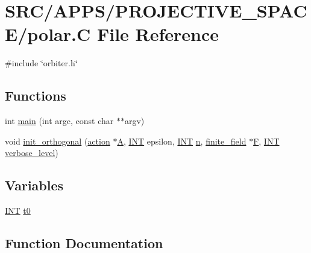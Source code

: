 \hypertarget{_a_p_p_s_2_p_r_o_j_e_c_t_i_v_e___s_p_a_c_e_2polar_8_c}{}\section{S\+R\+C/\+A\+P\+P\+S/\+P\+R\+O\+J\+E\+C\+T\+I\+V\+E\+\_\+\+S\+P\+A\+C\+E/polar.C File Reference}
\label{_a_p_p_s_2_p_r_o_j_e_c_t_i_v_e___s_p_a_c_e_2polar_8_c}
{\ttfamily \#include \char`\"{}orbiter.\+h\char`\"{}}\newline
\subsection*{Functions}
\begin{DoxyCompactItemize}
\item 
int \mbox{\hyperlink{_a_p_p_s_2_p_r_o_j_e_c_t_i_v_e___s_p_a_c_e_2polar_8_c_a217dbf8b442f20279ea00b898af96f52}{main}} (int argc, const char $\ast$$\ast$argv)
\item 
void \mbox{\hyperlink{_a_p_p_s_2_p_r_o_j_e_c_t_i_v_e___s_p_a_c_e_2polar_8_c_abf695eb9f6a0c10d5aa0c0ce4b60ad6d}{init\+\_\+orthogonal}} (\mbox{\hyperlink{classaction}{action}} $\ast$\mbox{\hyperlink{simeon_8_c_a97833f04c3a9c008df5521a2fc291bb4}{A}}, \mbox{\hyperlink{galois_8h_a09fddde158a3a20bd2dcadb609de11dc}{I\+NT}} epsilon, \mbox{\hyperlink{galois_8h_a09fddde158a3a20bd2dcadb609de11dc}{I\+NT}} \mbox{\hyperlink{simeon_8_c_a7f2cd26777ce0ff3fdaf8d02aacbddfb}{n}}, \mbox{\hyperlink{classfinite__field}{finite\+\_\+field}} $\ast$\mbox{\hyperlink{simeon_8_c_a21a61c535ff7d9d4b674461d3b19fffa}{F}}, \mbox{\hyperlink{galois_8h_a09fddde158a3a20bd2dcadb609de11dc}{I\+NT}} \mbox{\hyperlink{simeon_8_c_a818073fbcc2f439e7c56952f67386122}{verbose\+\_\+level}})
\end{DoxyCompactItemize}
\subsection*{Variables}
\begin{DoxyCompactItemize}
\item 
\mbox{\hyperlink{galois_8h_a09fddde158a3a20bd2dcadb609de11dc}{I\+NT}} \mbox{\hyperlink{_a_p_p_s_2_p_r_o_j_e_c_t_i_v_e___s_p_a_c_e_2polar_8_c_a4268f4fe222ffb119218a0199f5e1904}{t0}}
\end{DoxyCompactItemize}


\subsection{Function Documentation}
\mbox{\label{_a_p_p_s_2_p_r_o_j_e_c_t_i_v_e___s_p_a_c_e_2polar_8_c_abf695eb9f6a0c10d5aa0c0ce4b60ad6d}} 
